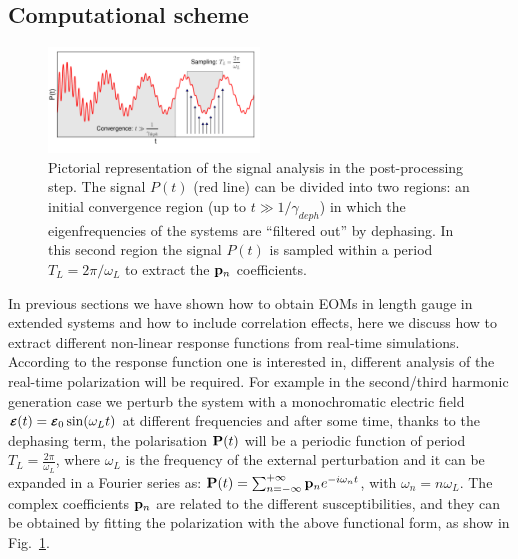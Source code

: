 \subsection{Computational scheme}\label{sc:compdet}
\begin{figure}
	\includegraphics[width=0.5\textwidth]{Figures/Pt_analysis}
\caption{\footnotesize{Pictorial representation of the signal analysis in the post-processing step. The signal  $P(t)$ (red line) can be divided into two regions: an initial convergence region (up to $t\gg 1/\gamma_{deph}$) in which the eigenfrequencies of the systems are ``filtered out'' by dephasing. In this second region the signal $P(t)$ is sampled within a period $T_L=2\pi/\omega_L$ to extract the ${\bf p}_n$ coefficients. %
	\label{fg:ptanalysis} }} 
\end{figure}
In previous sections we have shown how to obtain EOMs in length gauge in extended systems and how to include correlation effects, here we discuss how to extract different non-linear response functions from real-time simulations.\\
According to the response function one is interested in, different analysis of the real-time polarization will be required. For example in the second/third harmonic generation case we perturb the system with a monochromatic electric field $\boldsymbol{\scriptstyle \cal E}(t) = \boldsymbol{\scriptstyle \cal E}_0 \sin(\omega_L t)$ at different frequencies and after some time, thanks to the dephasing term, the  polarisation ${\bf P}(t)$ will be a periodic function of period $T_L =\frac{2\pi}{\omega_L}$, where $\omega_L$ is the frequency of the external perturbation and it can be expanded in a Fourier series as: $ {\bf P}(t) = \sum_{n=-\infty}^{+\infty} {\bf p}_n e^{-i\omega_n t} $, with $\omega_n = n \omega_L$. The complex coefficients ${\bf p}_n$ are related to the different susceptibilities, and they can be obtained by fitting the polarization with the above functional form, as show in Fig.~\ref{fg:ptanalysis}. 

